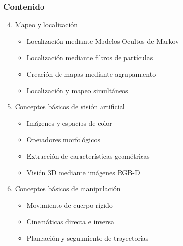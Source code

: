 \begin{frame}\frametitle{Contenido}
  \begin{enumerate}
    \setcounter{enumi}{3}
  \item Mapeo y localización
    \begin{itemize}
    \item Localización mediante Modelos Ocultos de Markov
    \item Localización mediante filtros de partículas
    \item Creación de mapas mediante agrupamiento
    \item Localización y mapeo simultáneos
    \end{itemize}
  \item Conceptos básicos de visión artificial
    \begin{itemize}
    \item Imágenes y espacios de color
    \item Operadores morfológicos
    \item Extracción de características geométricas
    \item Visión 3D mediante imágenes RGB-D
    \end{itemize}
  \item Conceptos básicos de manipulación
    \begin{itemize}
    \item Movimiento de cuerpo rígido
    \item Cinemáticas directa e inversa
    \item Planeación y seguimiento de trayectorias
    \end{itemize}
  \end{enumerate}
\end{frame}

